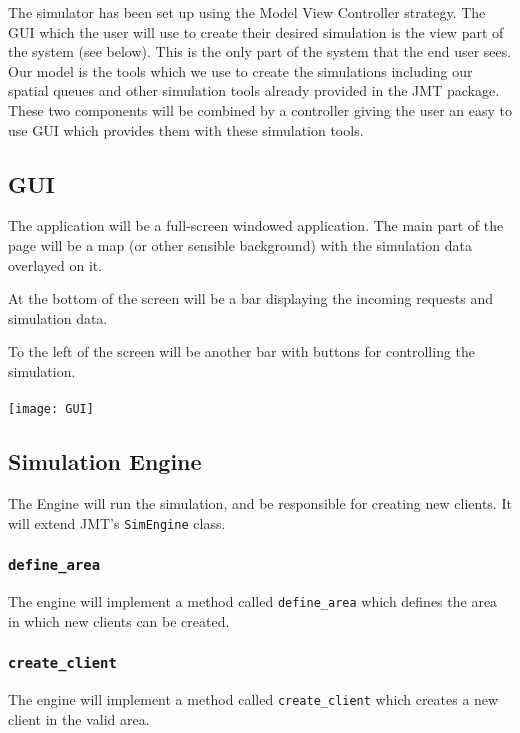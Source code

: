 \documentclass[a4paper]{article}
\begin{document}
The simulator has been set up using the Model View Controller strategy. The GUI which the user will use to create their desired simulation is the view part of the system (see below). This is the only part of the system that the end user sees. Our model is the tools which we use to create the simulations including our spatial queues and other simulation tools already provided in the JMT package. These two components will be combined by a controller giving the user an easy to use GUI which provides them with these simulation tools.

\subsection{GUI}%

The application will be a full-screen windowed application. The main part of the page will be a map (or other sensible background) with the simulation data overlayed on it.

At the bottom of the screen will be a bar displaying the incoming requests and simulation data.

To the left of the screen will be another bar with buttons for controlling the simulation.
\\
\\
\texttt{[image: GUI]}

\subsection{Simulation Engine}%

The Engine will run the simulation, and be responsible for creating new clients. It will extend JMT's \lstinline{SimEngine} class.

\subsubsection{\lstinline{define_area}}

The engine will implement a method called \lstinline{define_area} which defines the area in which new clients can be created.

\subsubsection{\lstinline{create_client}}

The engine will implement a method called \lstinline{create_client} which creates a new client in the valid area. 
\end{document}
